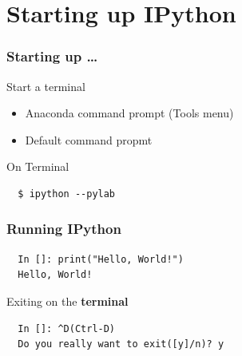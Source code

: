 \documentclass[14pt,compress]{beamer}
\begin{document}

\section{Starting up IPython}
\begin{frame}[fragile]
\frametitle{Starting up \ldots}
\begin{block}{Start a terminal}
  \begin{itemize}
    \item Anaconda command prompt (Tools menu)
    \item Default command propmt
\end{itemize}
\end{block}

\begin{block}{On Terminal}
\begin{lstlisting}
  $ ipython --pylab
\end{lstlisting} %
\end{block}
\end{frame}




\begin{frame}[fragile]
\frametitle{Running IPython}
\begin{lstlisting}
  In []: print("Hello, World!")
  Hello, World!
\end{lstlisting}

Exiting on the \textbf{terminal}
\begin{lstlisting}
  In []: ^D(Ctrl-D)
  Do you really want to exit([y]/n)? y
\end{lstlisting}
\end{frame}
\end{document}
